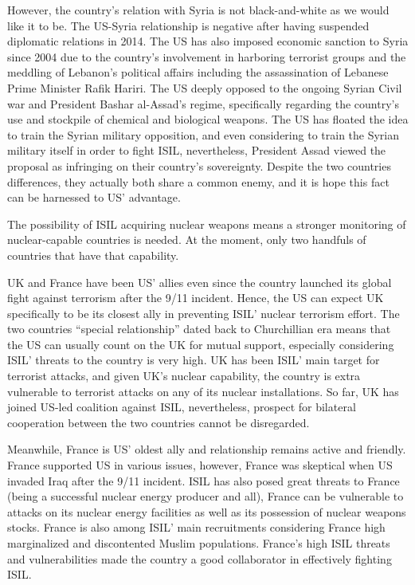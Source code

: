 \documentclass{report}
\begin{document}
However, the country’s relation with Syria is not black-and-white as we would like it to be. The US-Syria relationship is negative after having suspended diplomatic relations in 2014. The US has also imposed economic sanction to Syria since 2004 due to the country’s involvement in harboring terrorist groups and the meddling of Lebanon’s political affairs including the assassination of Lebanese Prime Minister Rafik Hariri. The US deeply opposed to the ongoing Syrian Civil war and President Bashar al-Assad’s regime, specifically regarding the country’s use and stockpile of chemical and biological weapons. The US has floated the idea to train the Syrian military opposition, and even considering to train the Syrian military itself in order to fight ISIL, nevertheless, President Assad viewed the proposal as infringing on their country’s sovereignty. Despite the two countries differences, they actually both share a common enemy, and it is hope this fact can be harnessed to US’ advantage.

The possibility of ISIL acquiring nuclear weapons means a stronger monitoring of nuclear-capable countries is needed. At the moment, only two handfuls of countries that have that capability. 

UK and France have been US’ allies even since the country launched its global fight against terrorism after the 9/11 incident. Hence, the US can expect UK specifically to be its closest ally in preventing ISIL’ nuclear terrorism effort. The two countries \enquote{special relationship} dated back to Churchillian era means that the US can usually count on the UK for mutual support, especially considering ISIL’ threats to the country is very high. UK has been ISIL’ main target for terrorist attacks, and given UK’s nuclear capability, the country is extra vulnerable to terrorist attacks on any of its nuclear installations. So far, UK has joined US-led coalition against ISIL, nevertheless, prospect for bilateral cooperation between the two countries cannot be disregarded.

Meanwhile, France is US’ oldest ally and relationship remains active and friendly. France supported US in various issues, however, France was skeptical when US invaded Iraq after the 9/11 incident. ISIL has also posed great threats to France (being a successful nuclear energy producer and all), France can be vulnerable to attacks on its nuclear energy facilities as well as its possession of nuclear weapons stocks. France is also among ISIL’ main recruitments considering France high marginalized and discontented Muslim populations. France’s high ISIL threats and vulnerabilities made the country a good collaborator in effectively fighting ISIL.
\end{document}

